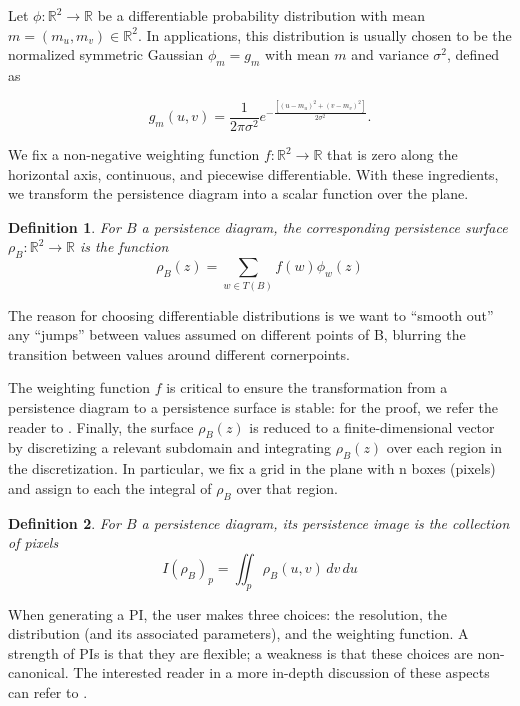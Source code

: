 \documentclass[english, LaM, oneside, noexaminfo]{sapthesis}
\newtheorem{defin}{\bf Definition}[section]
\begin{document}
Let $\phi : \mathbb{R}^2 \rightarrow \mathbb{R}$ be a differentiable probability distribution with mean $m = (m_u, m_v) \in \mathbb{R}^2$. In applications, this distribution is usually chosen to be the normalized symmetric Gaussian $\phi_m = g_m$ with mean $m$ and variance $\sigma^2$, defined as
 
$$g_m(u, v) = \frac{1}{2\pi \sigma^2}e^{-\frac{[(u- m_u)^2+(v- m_v)^2]}{2\sigma^2}}.$$

We fix a non-negative weighting function $f: \mathbb{R}^2 \rightarrow \mathbb{R}$ that is zero along the horizontal axis, continuous, and piecewise differentiable. With these ingredients, we transform the persistence diagram into a scalar function over the plane.

\begin{defin} For $B$ a persistence diagram, the corresponding \textit{persistence surface} $\rho_B : \mathbb{R}^2 \rightarrow \mathbb{R}$ is the function 
$$ \rho_B(z) = \sum_{w \in T(B)} f(w)\phi_w(z)$$ \end{defin}

The reason for choosing differentiable distributions is we want to ``smooth out'' any ``jumps'' between values assumed on different points of B, blurring the transition between values around different cornerpoints.

The weighting function $f$ is critical to ensure the transformation from a persistence diagram to a persistence surface is stable: for the proof, we refer the reader to \cite{adams2017persistence}.
Finally, the surface $\rho_B(z)$ is reduced to a finite-dimensional vector by discretizing a relevant
subdomain and integrating $\rho_B(z)$ over each region in the discretization. In particular,
we fix a grid in the plane with n boxes (pixels) and assign to each the integral of $\rho_B$ over
that region.

\begin{defin}For $B$ a persistence diagram, its \textit{persistence image} is the collection of pixels $$I(\rho_B)_p = \iint_p \rho_B(u,v) \,dv\,du $$\end{defin}

When generating a PI, the user makes three choices: the resolution, the distribution
(and its associated parameters), and the weighting function. A strength of PIs is that they
are flexible; a weakness is that these choices are non-canonical. The interested reader in a more in-depth discussion of these aspects can refer to \cite{adams2017persistence}.
\end{document}
